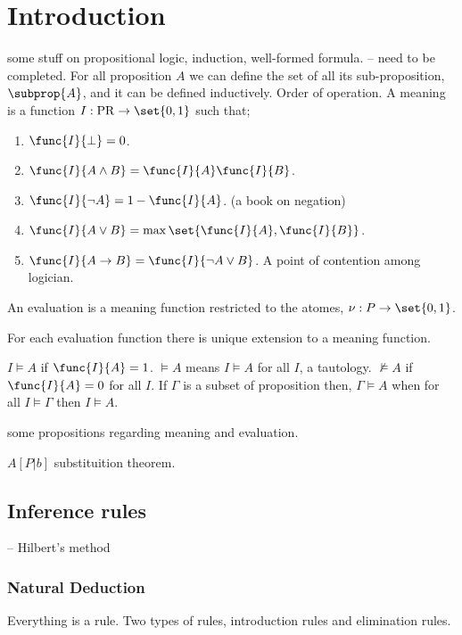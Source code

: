 \chapter{Introduction}
some stuff on propositional logic, induction, well-formed formula. -- need to be completed.
For all proposition \(A\) we can define the set of all its sub-proposition, \(\subprop {A}\), and it can be defined inductively. Order of operation. A meaning is a function \(I : \mathrm{PR} \to \set{0,1}\) such that;
\begin{enumerate}
    \item \(\func{I}{\perp} = 0 \).
    \item \(\func{I}{A \land B} = \func{I}{A} \func{I}{B}\).
    \item \(\func{I}{\neg A} = 1 - \func{I}{A}\). (a book on negation)
    \item \(\func{I}{A \lor B} = \max \set{\func{I}{A}, \func{I}{B}}\).
    \item \(\func{I}{A \to B} = \func{I}{\neg A \lor B}\). A point of contention among logician.
\end{enumerate}
An evaluation is a meaning function restricted to the atomes, \(\nu : P \to \set{0,1}\).

\begin{theorem}
    For each evaluation function there is unique extension to a meaning function.
\end{theorem}

\(I \models A\) if \(\func{I}{A} = 1\). \(\models A\) means \(I \models A\) for all \(I\), a tautology. \(\not\models A\) if \(\func{I}{A} = 0\) for all \(I\). If \(\Gamma\) is a subset of proposition then, \(\Gamma \models A\) when for all \(I \models \Gamma\) then \(I \models A\).

some propositions regarding meaning and evaluation.

\(A[P|b]\)
 substituition  theorem.
 \section{Inference rules}
 -- Hilbert's method
 \subsection{Natural Deduction}
 Everything is a rule. Two types of rules, introduction rules and elimination rules.